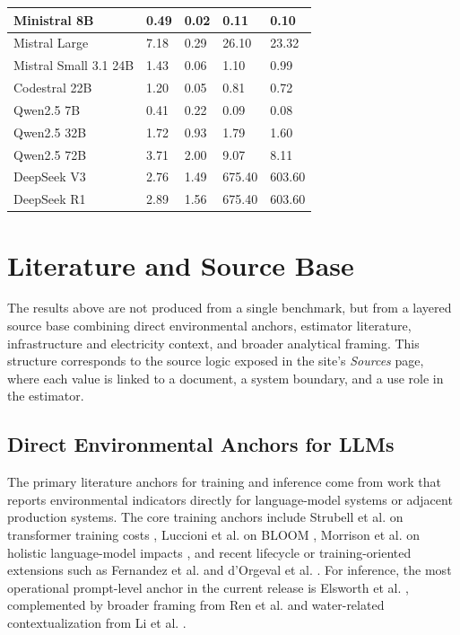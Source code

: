 \documentclass[10pt,a4paper]{article}
\begin{document}
\begin{longtable}{|L{4.0cm}|L{2.0cm}|L{2.2cm}|L{1.7cm}|L{1.8cm}|}
\hline
Ministral 8B & 0.49 & 0.02 & 0.11 & 0.10 \\
\hline
Mistral Large & 7.18 & 0.29 & 26.10 & 23.32 \\
\hline
Mistral Small 3.1 24B & 1.43 & 0.06 & 1.10 & 0.99 \\
\hline
Codestral 22B & 1.20 & 0.05 & 0.81 & 0.72 \\
\hline
Qwen2.5 7B & 0.41 & 0.22 & 0.09 & 0.08 \\
\hline
Qwen2.5 32B & 1.72 & 0.93 & 1.79 & 1.60 \\
\hline
Qwen2.5 72B & 3.71 & 2.00 & 9.07 & 8.11 \\
\hline
DeepSeek V3 & 2.76 & 1.49 & 675.40 & 603.60 \\
\hline
DeepSeek R1 & 2.89 & 1.56 & 675.40 & 603.60 \\
\hline
\end{longtable}

\section{Literature and Source Base}
The results above are not produced from a single benchmark, but from a layered source base combining direct environmental anchors, estimator literature, infrastructure and electricity context, and broader analytical framing. This structure corresponds to the source logic exposed in the site's \emph{Sources} page, where each value is linked to a document, a system boundary, and a use role in the estimator.

\subsection{Direct Environmental Anchors for LLMs}
The primary literature anchors for training and inference come from work that reports environmental indicators directly for language-model systems or adjacent production systems. The core training anchors include Strubell et al. on transformer training costs \cite{strubell2019}, Luccioni et al. on BLOOM \cite{luccioni2023}, Morrison et al. on holistic language-model impacts \cite{morrison2025}, and recent lifecycle or training-oriented extensions such as Fernandez et al. \cite{fernandez2025lca} and d'Orgeval et al. \cite{dorgeval2026}. For inference, the most operational prompt-level anchor in the current release is Elsworth et al. \cite{elsworth2025}, complemented by broader framing from Ren et al. \cite{ren2024} and water-related contextualization from Li et al. \cite{li2025water}.
\end{document}

